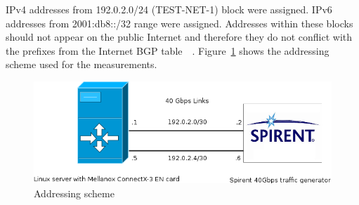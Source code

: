 IPv4 addresses from 192.0.2.0/24 (TEST-NET-1) block were assigned.
IPv6 addresses from 2001:db8::/32 range were assigned.
Addresses within these blocks should not appear on the public Internet
and therefore they do not conflict with the prefixes from the Internet BGP table~\cite{rfc3849}~\cite{rfc5737}.
Figure~\ref{fig:addressing-scheme} shows the addressing scheme used for the measurements.
\begin{figure}[H]
	\centering
	\includegraphics[width=13.5cm,keepaspectratio]{fig/net-setup.png}
	\caption{Addressing scheme}
	\label{fig:addressing-scheme}
\end{figure}








